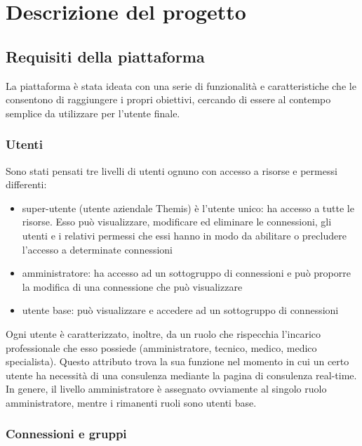 \chapter{Descrizione del progetto}
\label{chap:descrizione del progetto}

\section{Requisiti della piattaforma}
\label{sec:requisiti della piattaforma}

La piattaforma è stata ideata con una serie di funzionalità e caratteristiche che le consentono di raggiungere i propri obiettivi, cercando di essere al contempo semplice da utilizzare per l’utente finale.

\subsection{Utenti}
\label{sec:utenti}

Sono stati pensati tre livelli di utenti ognuno con accesso a risorse e permessi differenti:
\begin{itemize}
    \item super-utente (utente aziendale Themis) è l'utente unico: ha accesso a tutte le risorse.  Esso può visualizzare, modificare ed eliminare le connessioni, gli utenti e i relativi permessi che essi hanno in modo da abilitare o precludere l'accesso a determinate connessioni
    \item amministratore: ha accesso ad un sottogruppo di connessioni e può proporre la modifica di una connessione che può visualizzare
    \item utente base: può visualizzare e accedere ad un sottogruppo di connessioni
\end{itemize}

Ogni utente è caratterizzato, inoltre, da un ruolo che rispecchia l'incarico professionale che esso possiede (amministratore, tecnico, medico, medico specialista). Questo attributo trova la sua funzione nel momento in cui un certo utente ha necessità di una consulenza mediante la pagina di consulenza real-time. In genere, il livello amministratore è assegnato ovviamente al singolo ruolo amministratore, mentre i rimanenti ruoli sono utenti base.

\subsection{Connessioni e gruppi}
\label{sec:connessioni e gruppi}

